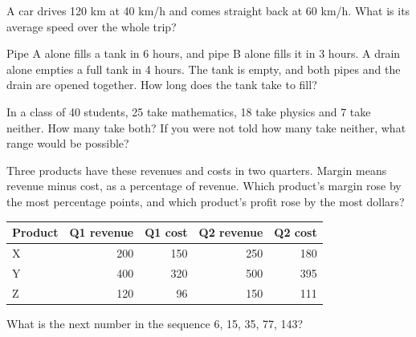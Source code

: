 \begin{question}\label{iq:iv1:sequences-patterns-and-aptitude:13}
A car drives 120 km at 40 km/h and comes straight back at 60 km/h. What is its average speed over the whole trip?
\end{question}

\begin{question}\label{iq:iv1:sequences-patterns-and-aptitude:14}
Pipe A alone fills a tank in 6 hours, and pipe B alone fills it in 3 hours. A drain alone empties a full tank in 4 hours. The tank is empty, and both pipes and the drain are opened together. How long does the tank take to fill?
\end{question}

\begin{question}\label{iq:iv1:sequences-patterns-and-aptitude:15}
In a class of 40 students, 25 take mathematics, 18 take physics and 7 take neither. How many take both? If you were not told how many take neither, what range would be possible?
\end{question}

\begin{question}\label{iq:iv1:sequences-patterns-and-aptitude:16}
Three products have these revenues and costs in two quarters. Margin means revenue minus cost, as a percentage of revenue. Which product's margin rose by the most percentage points, and which product's profit rose by the most dollars?

\smallskip
\begin{tabular}{lrrrr}
\hline
Product & Q1 revenue & Q1 cost & Q2 revenue & Q2 cost \\
\hline
X & 200 & 150 & 250 & 180 \\
Y & 400 & 320 & 500 & 395 \\
Z & 120 & 96 & 150 & 111 \\
\hline
\end{tabular}
\end{question}

\begin{question}\label{iq:iv1:sequences-patterns-and-aptitude:17}
What is the next number in the sequence 6, 15, 35, 77, 143?
\end{question}

